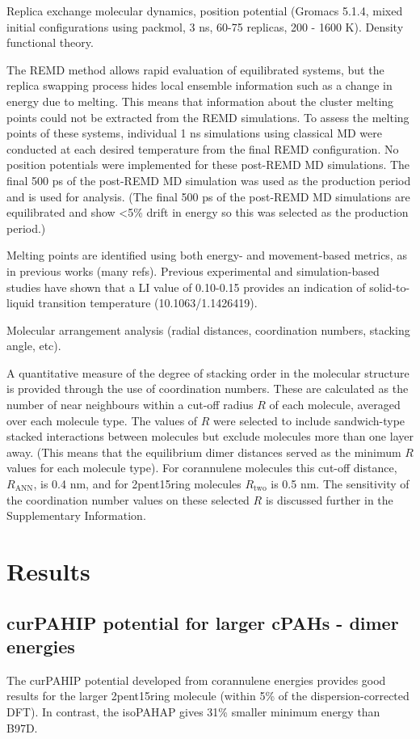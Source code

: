 Replica exchange molecular dynamics, position potential (Gromacs 5.1.4, mixed initial configurations using packmol, 3 ns, 60-75 replicas, 200 - 1600 K).
Density functional theory.

The REMD method allows rapid evaluation of equilibrated systems, but the replica swapping process hides local ensemble information such as a change in energy due to melting. This means that information about the cluster melting points could not be extracted from the REMD simulations. To assess the melting points of these systems, individual 1 ns simulations using classical MD were conducted at each desired temperature from the final REMD configuration. No position potentials were implemented for these post-REMD MD simulations.
The final 500 ps of the post-REMD MD simulation was used as the production period and is used for analysis.
(The final 500 ps of the post-REMD MD simulations are equilibrated and show <5\% drift in energy so this was selected as the production period.)

Melting points are identified using both energy- and movement-based metrics, as in previous works (many refs).
Previous experimental and simulation-based studies have shown that a LI value of 0.10-0.15 provides an indication of solid-to-liquid transition temperature (10.1063/1.1426419).

Molecular arrangement analysis (radial distances, coordination numbers, stacking angle, etc).

A quantitative measure of the degree of stacking order in the molecular structure is provided through the use of coordination numbers. These are calculated as the number of near neighbours within a cut-off radius $R$ of each molecule, averaged over each molecule type. The values of $R$ were selected to include sandwich-type stacked interactions between molecules but exclude molecules more than one layer away. (This means that the equilibrium dimer distances served as the minimum $R$ values for each molecule type). For corannulene molecules this cut-off distance, $R_{\text{ANN}}$, is 0.4 nm, and for 2pent15ring molecules $R_{\text{two}}$ is 0.5 nm.  The sensitivity of the coordination number values on these selected $R$ is discussed further in the Supplementary Information.


\section{Results}
\subsection{curPAHIP potential for larger cPAHs - dimer energies}
The curPAHIP potential developed from corannulene energies provides good results for the larger 2pent15ring molecule (within 5\% of the dispersion-corrected DFT). In contrast, the isoPAHAP gives 31\% smaller minimum energy than B97D.


